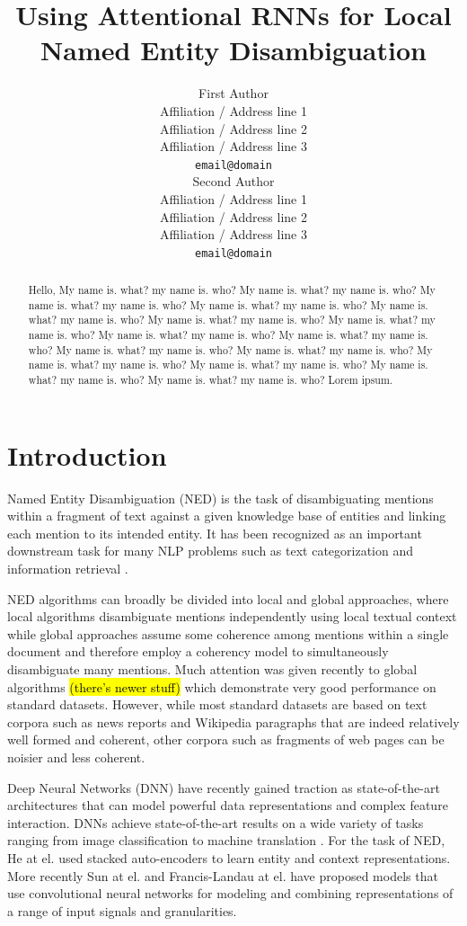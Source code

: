 \documentclass[11pt]{article}
\title{Using Attentional RNNs for Local Named Entity Disambiguation}
\author{First Author \\
	Affiliation / Address line 1 \\
	Affiliation / Address line 2 \\
	Affiliation / Address line 3 \\
	{\tt email@domain} \\\And
	Second Author \\
	Affiliation / Address line 1 \\
	Affiliation / Address line 2 \\
	Affiliation / Address line 3 \\
	{\tt email@domain} \\}
\date{}
\begin{document}
	\maketitle
	\begin{abstract}
		Hello, My name is. what? my name is. who?
		My name is. what? my name is. who?
		My name is. what? my name is. who?
		My name is. what? my name is. who?
		My name is. what? my name is. who?
		My name is. what? my name is. who?
		My name is. what? my name is. who?
		My name is. what? my name is. who?
		My name is. what? my name is. who?
		My name is. what? my name is. who?
		My name is. what? my name is. who?
		My name is. what? my name is. who?
		My name is. what? my name is. who?
		My name is. what? my name is. who?
		My name is. what? my name is. who? Lorem ipsum.
	\end{abstract}
	
	\section{Introduction}
	
	Named Entity Disambiguation (NED) is the task of disambiguating mentions within a fragment of text against a given knowledge base of entities and linking each mention to its intended entity. It has been recognized as an important downstream task for many NLP problems such as text categorization \cite{gabrilovich2007computing} and information retrieval \cite{dalton2014entity}. 
	
	NED algorithms can broadly be divided into local and global approaches, where local algorithms disambiguate mentions independently using local textual context while global approaches assume some coherence among mentions within a single document and therefore employ a coherency model to simultaneously disambiguate many mentions. Much attention was given recently to global algorithms \cite{ratinov2011local,guo2014entity,pershina2015personalized} \hl{(there's newer stuff)} which demonstrate very good performance on standard datasets. However, while most standard datasets are based on text corpora such as news reports and Wikipedia paragraphs that are indeed relatively well formed and coherent, other corpora such as fragments of web pages can be noisier and less coherent.
	
	Deep Neural Networks (DNN) have recently gained traction as state-of-the-art architectures that can model powerful data representations and complex feature interaction. DNNs achieve state-of-the-art results on a wide variety of tasks ranging from image classification \cite{krizhevsky2012imagenet} to machine translation \cite{bahdanau2014neural}. For the task of NED, He at el.  used stacked auto-encoders to learn entity and context representations. More recently Sun at el. and Francis-Landau at el.  have proposed models that use convolutional neural networks for modeling and combining representations of a range of input signals and granularities. 
	
\end{document}
